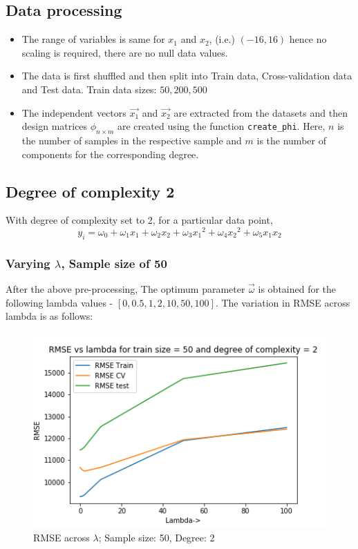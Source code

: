 \documentclass[12pt,a4paper]{article}
\def\tt#1{\texttt{#1}}
\begin{document}
\subsection{Data processing}
\begin{itemize}
    \itemsep0em
    \item The range of variables is same for $x_1$ and $x_2$, (i.e.) $(-16,16)$ hence no scaling is required, there are no null data values.
    \item The data is first shuffled and then split into Train data, Cross-validation data and Test data. Train data sizes: $50, 200, 500$
    \item The independent vectors $\vec{x_1}$ and $\vec{x_2}$ are extracted from the datasets and then design matrices $\phi_{n\times m}$ are created using the function \tt{create\_phi}. Here, $n$ is the number of samples in the respective sample and $m$ is the number of components for the corresponding degree.
\end{itemize}

\subsection{Degree of complexity 2}
With degree of complexity set to 2, for a particular data point, 
\begin{equation}
y_{i}=\omega_{0}+\omega_{1}x_1 + \omega_{2}x_2 + \omega_{3}{x_1}^2+\omega_{4}{x_2}^2+\omega_{5}{x_1}{x_2}
\end{equation}

 
\subsubsection{Varying $\lambda$, Sample size of 50}
After the above pre-processing, The optimum parameter \textbf{$\vec{\omega}$} is obtained for the following lambda values - $[0, 0.5, 1, 2, 10, 50, 100]$. The variation in RMSE across lambda is as follows:\\
 
\begin{figure}[H]
     \centering
     \includegraphics[scale=0.7]{images/d2_50.png}
     \caption{RMSE across $\lambda$; Sample size: 50,  Degree: 2}
\end{figure}
 
\end{document}
